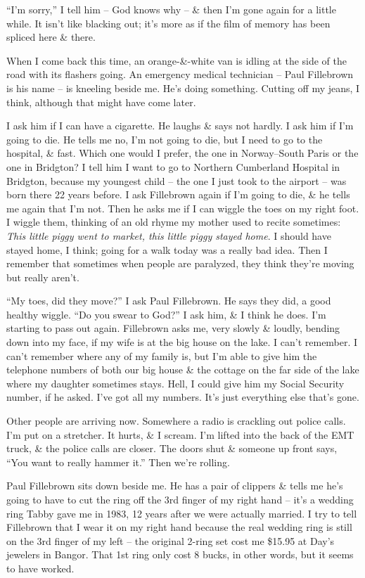 \documentclass{article}
\numberwithin{equation}{section}
\begin{document}
``I'm sorry,'' I tell him -- God knows why -- \& then I'm gone again for a little while. It isn't like blacking out; it's more as if the film of memory has been spliced here \& there.

When I come back this time, an orange-\&-white van is idling at the side of the road with its flashers going. An emergency medical technician -- Paul Fillebrown is his name -- is kneeling beside me. He's doing something. Cutting off my jeans, I think, although that might have come later.

I ask him if I can have a cigarette. He laughs \& says not hardly. I ask him if I'm going to die. He tells me no, I'm not going to die, but I need to go to the hospital, \& fast. Which one would I prefer, the one in Norway--South Paris or the one in Bridgton? I tell him I want to go to Northern Cumberland Hospital in Bridgton, because my youngest child -- the one I just took to the airport -- was born there 22 years before. I ask Fillebrown again if I'm going to die, \& he tells me again that I'm not. Then he asks me if I can wiggle the toes on my right foot. I wiggle them, thinking of an old rhyme my mother used to recite sometimes: \textit{This little piggy went to market, this little piggy stayed home}. I should have stayed home, I think; going for a walk today was a really bad idea. Then I remember that sometimes when people are paralyzed, they think they're moving but really aren't.

``My toes, did they move?'' I ask Paul Fillebrown. He says they did, a good healthy wiggle. ``Do you swear to God?'' I ask him, \& I think he does. I'm starting to pass out again. Fillebrown asks me, very slowly \& loudly, bending down into my face, if my wife is at the big house on the lake. I can't remember. I can't remember where any of my family is, but I'm able to give him the telephone numbers of both our big house \& the cottage on the far side of the lake where my daughter sometimes stays. Hell, I could give him my Social Security number, if he asked. I've got all my numbers. It's just everything else that's gone.

Other people are arriving now. Somewhere a radio is crackling out police calls. I'm put on a stretcher. It hurts, \& I scream. I'm lifted into the back of the EMT truck, \& the police calls are closer. The doors shut \& someone up front says, ``You want to really hammer it.'' Then we're rolling.

Paul Fillebrown sits down beside me. He has a pair of clippers \& tells me he's going to have to cut the ring off the 3rd finger of my right hand -- it's a wedding ring Tabby gave me in 1983, 12 years after we were actually married. I try to tell Fillebrown that I wear it on my right hand because the real wedding ring is still on the 3rd finger of my left -- the original 2-ring set cost me \$15.95 at Day's jewelers in Bangor. That 1st ring only cost 8 bucks, in other words, but it seems to have worked.
\end{document}

